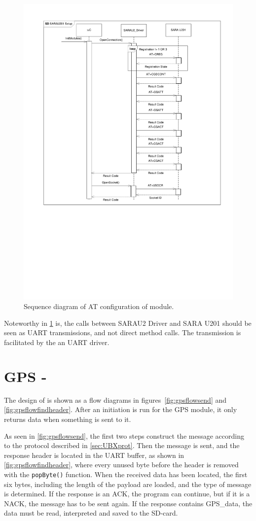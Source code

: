 \begin{figure}
	\centering
	\includegraphics[width=0.9\linewidth, clip, trim={2cm 9cm 1cm 1cm}]{gfx/Design/GSMSetupConnection.pdf}
	\caption{Sequence diagram of AT configuration of \SARA module.}
	\label{fig:SD:configConnection}
\end{figure}

Noteworthy in \cref{fig:SD:configConnection} is, the calls between SARAU2 Driver and SARA U201 should be seen as UART transmissions, and not direct method calls. The transmission is facilitated by the an UART driver. 

\section{GPS - \GPS}
The design of  is shown as a flow diagrams in figures~\ref{fig:gpsflowsend} and \ref{fig:gpsflowfindheader}.
After an initiation is run for the GPS module, it only returns data when something is sent to it.

As seen in \cref{fig:gpsflowsend}, the first two steps construct the message according to the protocol described in \cref{sec:UBXprot}.
Then the message is sent, and the response header is located in the UART buffer, as shown in \cref{fig:gpsflowfindheader}, where every unused byte before the header is removed with the \texttt{popByte()} function.
When the received data has been located, the first six bytes, including the length of the payload are loaded, and the type of message is determined.
If the response is an ACK, the program can continue, but if it is a NACK, the message has to be sent again.
If the response contains GPS\_data, the data must be read, interpreted and saved to the SD-card.

